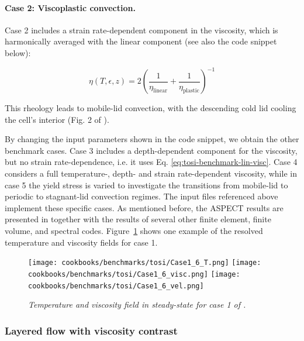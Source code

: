 \documentclass{article}
\newcommand{\aspect}{\textsc{ASPECT}}
\begin{document}
\paragraph{Case 2: Viscoplastic convection.}
\label{sec:benchmark-tosi-case-2}
Case 2 includes a strain rate-dependent component in the viscosity, which is harmonically averaged with the linear component (see also the code snippet below):

\begin{equation}
  \eta(T,\epsilon,z) = 2 \left(\frac{1}{\eta_\text{linear}}+\frac{1}{\eta_\text{plastic}}\right)^{-1}
  \label{eq:tosi-benchmark-ave-visc}
\end{equation}



This rheology leads to mobile-lid convection, with the descending cold lid cooling the cell's interior (Fig. 2 of \cite{T15}).

By changing the input parameters shown in the code snippet, we obtain the other benchmark cases.
Case 3 includes a depth-dependent component for the viscosity, but no strain rate-dependence, i.e. it uses Eq. \eqref{eq:tosi-benchmark-lin-visc}. Case 4 considers a full temperature-, depth- and strain rate-dependent viscosity, while in case 5 the yield stress is varied to investigate the transitions from mobile-lid to periodic to stagnant-lid convection regimes.
The input files referenced above implement these specific cases. As mentioned before, the \aspect{} results are presented in \cite{T15} together with the results of several other finite element, finite volume, and spectral codes. Figure~\ref{fig:tosi-benchmark-results} shows one example of the resolved temperature and viscosity fields for case 1. 	

\begin{figure}
  \begin{center}
    \texttt{[image: cookbooks/benchmarks/tosi/Case1\_6\_T.png]}
    \texttt{[image: cookbooks/benchmarks/tosi/Case1\_6\_visc.png]}
    \texttt{[image: cookbooks/benchmarks/tosi/Case1\_6\_vel.png]}
  \end{center}
  \caption{\it Temperature and viscosity field in steady-state for case 1 of \cite{T15}.}
  \label{fig:tosi-benchmark-results}
\end{figure}

\subsubsection{Layered flow with viscosity contrast}
\label{sec:benchmark-layeredflow}
\end{document}
